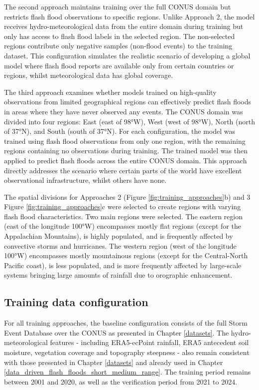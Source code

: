 The  second approach maintains training over the full CONUS domain but restricts flash flood observations to specific regions. Unlike Approach 2, the model receives hydro-meteorological data from the entire domain during training but only has access to flash flood labels in the selected region. The non-selected regions contribute only negative samples (non-flood events) to the training dataset. This configuration simulates the realistic scenario of developing a global model where flash flood reports are available only from certain countries or regions, whilst meteorological data has global coverage.

The  third approach examines whether models trained on high-quality observations from limited geographical regions can effectively predict flash floods in areas where they have never observed any events. The CONUS domain was divided into four regions: East (east of 98°W), West (west of 98°W), North (north of 37°N), and South (south of 37°N). For each configuration, the model was trained using flash flood observations from only one region, with the remaining regions containing no observations during training. The trained model was then applied to predict flash floods across the entire CONUS domain. This approach directly addresses the scenario where certain parts of the world have excellent observational infrastructure, whilst others have none.

The spatial divisions for Approaches 2 (Figure \ref{fig:training_approaches}b) and 3 Figure \ref{fig:training_approaches}c were selected to create regions with varying flash flood characteristics. Two main regions were selected. The eastern region (east of the longitude 100°W) encompasses mostly flat regions (except for the Appalachian Mountains), is highly populated, and is frequently affected by convective storms and hurricanes. The western region (west of the longitude 100°W) encompasses mostly mountainous regions (except for the Central-North Pacific coast), is less populated, and is more frequently affected by large-scale systems bringing large amounts of rainfall due to orographic enhancement.

\subsection{Training data configuration}
For all training approaches, the baseline configuration consists of the full Storm Event Database over the CONUS as presented in Chapter \ref{datasets}. The hydro-meteorological features - including ERA5-ecPoint rainfall, ERA5 antecedent soil moisture, vegetation coverage and topography steepness - also remain consistent with those presented in Chapter \ref{datasets} and already used in Chapter \ref{data_driven_flash_floods_short_medium_range}. The training period remains between 2001 and 2020, as well as the verification period from 2021 to 2024.

